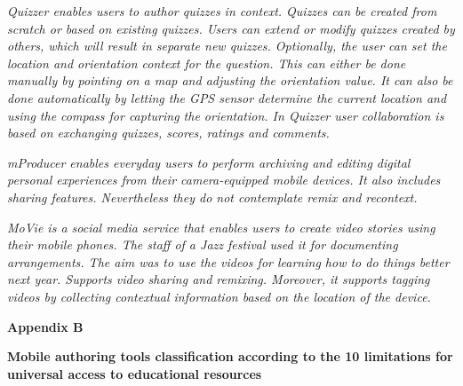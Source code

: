 \begin{small}
\em Quizzer \em \cite{Giemza2012} enables users to author quizzes in context. Quizzes can be created from scratch or based on existing quizzes. Users can extend or modify quizzes created by others, which will result in separate new quizzes. Optionally, the user can set the location and orientation context for the question. This can either be done manually by pointing on a map and adjusting the orientation value. It can also be done automatically by letting the GPS sensor determine the current location and using the compass for capturing the orientation. In \em Quizzer \em user collaboration is based on exchanging quizzes, scores, ratings and comments.

\em mProducer \em \cite{Wu2006} enables everyday users to perform archiving and editing digital personal experiences from their camera-equipped mobile devices. It also includes sharing features. Nevertheless they do not contemplate remix and recontext.

\em MoVie \em \cite{Multisilta2010} is a social media service that enables users to create video stories using their mobile phones. The staff of a Jazz festival used it for documenting arrangements. The aim was to use the videos for learning how to do things better next year. Supports video sharing and remixing. Moreover, it supports tagging videos by collecting contextual information based on the location of the device.

\end{small}



\clearpage{\pagestyle{empty}\cleardoublepage}

\begin{Large}
\textbf{Appendix B} 
\end{Large}
\vspace{3em}

\textbf{Mobile authoring tools classification according to the 10 limitations for universal access to educational resources}

